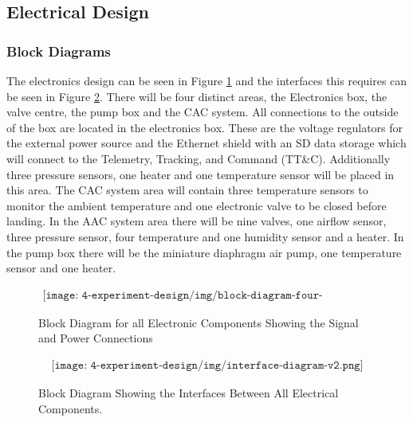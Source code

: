 \pagebreak
\subsection{Electrical Design}

\subsubsection{Block Diagrams}
\begin{centering}
The electronics design can be seen in Figure \ref{fig:electronics-block-diagram} and the interfaces this requires can be seen in Figure \ref{fig:eee-interface-diagram}. There will be four distinct areas, the Electronics box, the valve centre, the pump box and the CAC system. All connections to the outside of the box are located in the electronics box. These are the voltage regulators for the external power source and the Ethernet shield with an SD data storage which will connect to the Telemetry, Tracking, and Command (TT\&C). Additionally three pressure sensors, one heater and one temperature sensor will be placed in this area. The CAC system area will contain three temperature sensors to monitor the ambient temperature and one electronic valve to be closed before landing. In the AAC system area there will be nine valves, one airflow sensor, three pressure sensor, four temperature and one humidity sensor and a heater. In the pump box there will be the miniature diaphragm air pump, one temperature sensor and one heater. 
\end{centering}
\bigskip

\begin{figure}[H]
    \begin{align*}
        \texttt{[image: 4-experiment-design/img/block-diagram-four-sections.png]}
    \end{align*}
    \caption{Block Diagram for all Electronic Components Showing the Signal and Power Connections}\label{fig:electronics-block-diagram}
\end{figure}


\begin{figure}[H]
    \begin{align*}
        \texttt{[image: 4-experiment-design/img/interface-diagram-v2.png]}
    \end{align*}
    \caption{Block Diagram Showing the Interfaces Between All Electrical Components.}\label{fig:eee-interface-diagram}
\end{figure}

